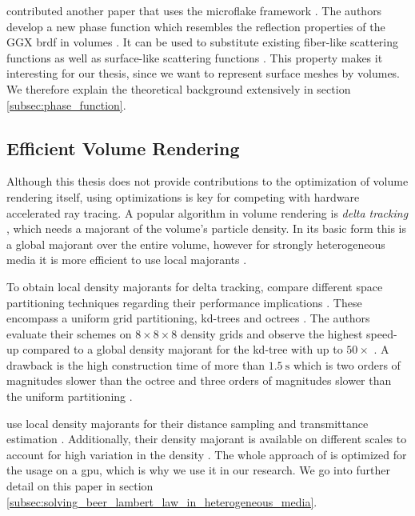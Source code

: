 \citeauthor{sggx} contributed another paper that uses the microflake framework \cite{sggx}.
The authors develop a new phase function which resembles the reflection properties of the GGX \ac{brdf} in volumes \cite{sggx}.
It can be used to substitute existing fiber-like scattering functions as well as surface-like scattering functions \cite{sggx}.
This property makes it interesting for our thesis, since we want to represent surface meshes by volumes.
We therefore explain the theoretical background extensively in section \ref{subsec:phase_function}.

\subsection{Efficient Volume Rendering}
Although this thesis does not provide contributions to the optimization of volume rendering itself, using optimizations is key for competing with hardware accelerated ray tracing.
A popular algorithm in volume rendering is \textit{delta tracking} \cite{woodcock}, which needs a majorant of the volume's particle density.
In its basic form this is a global majorant over the entire volume, however for strongly heterogeneous media it is more efficient to use local majorants \cite{novak_overview}.

To obtain local density majorants for delta tracking, \citeauthor{yue_space_partitioning} compare different space partitioning techniques regarding their performance implications \cite{yue_space_partitioning}.
These encompass a uniform grid partitioning, kd-trees and octrees \cite{yue_space_partitioning}.
The authors evaluate their schemes on $8\times8\times8$ density grids and observe the highest speed-up compared to a global density majorant for the kd-tree with up to ${50\times}$ \cite{yue_space_partitioning}.
A drawback is the high construction time of more than $\SI{1.5}{\s}$ which is two orders of magnitudes slower than the octree and three orders of magnitudes slower than the uniform partitioning \cite{yue_space_partitioning}.

\citeauthor{brick_grid} use local density majorants for their distance sampling and transmittance estimation \cite{brick_grid}.
Additionally, their density majorant is available on different scales to account for high variation in the density \cite{brick_grid}.
The whole approach of \citeauthor{brick_grid} is optimized for the usage on a \ac{gpu}, which is why we use it in our research.
We go into further detail on this paper in section \ref{subsec:solving_beer_lambert_law_in_heterogeneous_media}.

